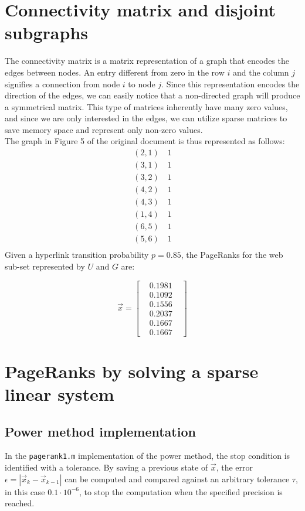 \documentclass[unicode,11pt,a4paper,oneside,numbers=endperiod,openany]{scrartcl}
\begin{document}
\section{Connectivity matrix and disjoint subgraphs }
The connectivity matrix is a matrix representation of a graph that encodes the edges between nodes. An entry different from zero in the row $i$ and the column $j$ signifies a connection from node $i$ to node $j$. Since this representation encodes the direction of the edges, we can easily notice that a non-directed graph will produce a symmetrical matrix. This type of matrices inherently have many zero values, and since we are only interested in the edges, we can utilize sparse matrices to save memory space and represent only non-zero values.
\\[1em]
The graph in Figure 5 of the original document is thus represented as follows: 
\begin{align*}
(2,1) \quad 1 \\
(3,1) \quad 1 \\
(3,2) \quad 1 \\
(4,2) \quad 1 \\
(4,3) \quad 1 \\
(1,4) \quad 1 \\
(6,5) \quad 1 \\
(5,6) \quad 1 \\
\end{align*}
Given a hyperlink transition probability $p = 0.85$, the PageRanks for the web sub-set represented by $U$ and $G$ are:

$$
\vec{x} = \begin{bmatrix} 
&0.1981& \\
&0.1092& \\
&0.1556& \\
&0.2037& \\
&0.1667& \\
&0.1667& 
\end{bmatrix}
$$

\vspace{.5em}

\section{PageRanks by solving a sparse linear system }
\subsection{Power method implementation}
In the \texttt{pagerank1.m} implementation of the power method, the stop condition is identified with a tolerance. By saving a previous state of $\vec{x}$, the error $\epsilon = |\vec{x}_k - \vec{x}_{k - 1}|$ can be computed and compared against an arbitrary tolerance $\tau$, in this case $0.1 \cdot 10^{-6}$, to stop the computation when the specified precision is reached.
\end{document}
